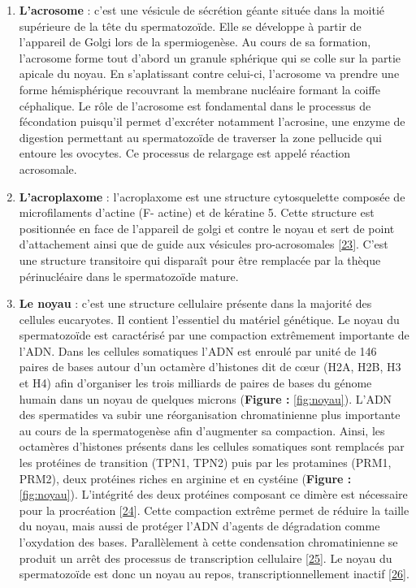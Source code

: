 \documentclass[12pt,twoside]{reedthesis}
\theoremstyle{definition}
\theoremstyle{definition}
\theoremstyle{remark}
\begin{document}
  \begin{enumerate}
  \def\labelenumi{\arabic{enumi}.}
  \item
    \textbf{L'acrosome} : c'est une vésicule de sécrétion géante située
    dans la moitié supérieure de la tête du spermatozoïde. Elle se
    développe à partir de l'appareil de Golgi lors de la spermiogenèse. Au
    cours de sa formation, l'acrosome forme tout d'abord un granule
    sphérique qui se colle sur la partie apicale du noyau. En
    s'aplatissant contre celui-ci, l'acrosome va prendre une forme
    hémisphérique recouvrant la membrane nucléaire formant la coiffe
    céphalique. Le rôle de l'acrosome est fondamental dans le processus de
    fécondation puisqu'il permet d'excréter notamment l'acrosine, une
    enzyme de digestion permettant au spermatozoïde de traverser la zone
    pellucide qui entoure les ovocytes. Ce processus de relargage est
    appelé réaction acrosomale.
  \item
    \textbf{L'acroplaxome} : l'acroplaxome est une structure cytosquelette
    composée de microfilaments d'actine (F- actine) et de kératine 5.
    Cette structure est positionnée en face de l'appareil de golgi et
    contre le noyau et sert de point d'attachement ainsi que de guide aux
    vésicules pro-acrosomales
    {[}\protect\hyperlink{ref-Kierszenbaum2004}{23}{]}. C'est une
    structure transitoire qui disparaît pour être remplacée par la thèque
    périnucléaire dans le spermatozoïde mature.
  \item
    \textbf{Le noyau} : c'est une structure cellulaire présente dans la
    majorité des cellules eucaryotes. Il contient l'essentiel du matériel
    génétique. Le noyau du spermatozoïde est caractérisé par une
    compaction extrêmement importante de l'ADN. Dans les cellules
    somatiques l'ADN est enroulé par unité de 146 paires de bases autour
    d'un octamère d'histones dit de cœur (H2A, H2B, H3 et H4) afin
    d'organiser les trois milliards de paires de bases du génome humain
    dans un noyau de quelques microns (\textbf{Figure : }\ref{fig:noyau}).
    L'ADN des spermatides va subir une réorganisation chromatinienne plus
    importante au cours de la spermatogenèse afin d'augmenter sa
    compaction. Ainsi, les octamères d'histones présents dans les cellules
    somatiques sont remplacés par les protéines de transition (TPN1, TPN2)
    puis par les protamines (PRM1, PRM2), deux protéines riches en
    arginine et en cystéine (\textbf{Figure : }\ref{fig:noyau}).
    L'intégrité des deux protéines composant ce dimère est nécessaire pour
    la procréation {[}\protect\hyperlink{ref-Cho2001}{24}{]}. Cette
    compaction extrême permet de réduire la taille du noyau, mais aussi de
    protéger l'ADN d'agents de dégradation comme l'oxydation des bases.
    Parallèlement à cette condensation chromatinienne se produit un arrêt
    des processus de transcription cellulaire
    {[}\protect\hyperlink{ref-Kierszenbaum1978}{25}{]}. Le noyau du
    spermatozoïde est donc un noyau au repos, transcriptionnellement
    inactif {[}\protect\hyperlink{ref-Ward1994}{26}{]}.
  \end{enumerate}
  
\end{document}
